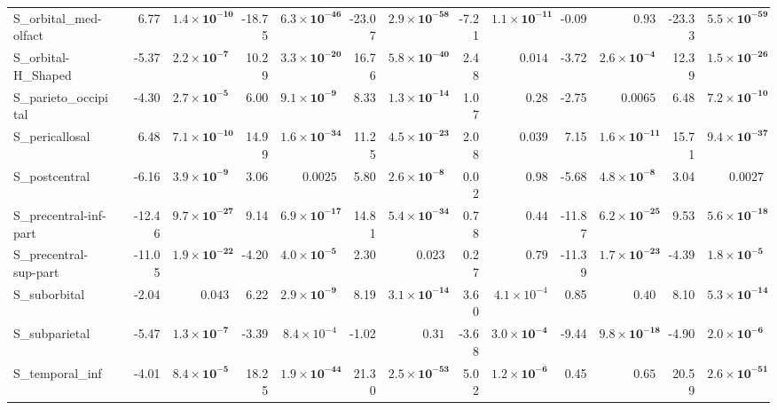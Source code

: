 {\begin{longtable}{llrrrrrrrrrrrr}
S\_orbital\_med-olfact &  & 6.77 & $\mathbf{1.4{\times}10^{-10}}$ & -18.75 & $\mathbf{6.3{\times}10^{-46}}$ & -23.07 & $\mathbf{2.9{\times}10^{-58}}$ & -7.21 & $\mathbf{1.1{\times}10^{-11}}$ & -0.09 & $0.93$ & -23.33 & $\mathbf{5.5{\times}10^{-59}}$ \\
S\_orbital-H\_Shaped &  & -5.37 & $\mathbf{2.2{\times}10^{-7}}$ & 10.29 & $\mathbf{3.3{\times}10^{-20}}$ & 16.76 & $\mathbf{5.8{\times}10^{-40}}$ & 2.48 & $0.014$ & -3.72 & $\mathbf{2.6{\times}10^{-4}}$ & 12.39 & $\mathbf{1.5{\times}10^{-26}}$ \\
S\_parieto\_occipital &  & -4.30 & $\mathbf{2.7{\times}10^{-5}}$ & 6.00 & $\mathbf{9.1{\times}10^{-9}}$ & 8.33 & $\mathbf{1.3{\times}10^{-14}}$ & 1.07 & $0.28$ & -2.75 & $0.0065$ & 6.48 & $\mathbf{7.2{\times}10^{-10}}$ \\
S\_pericallosal &  & 6.48 & $\mathbf{7.1{\times}10^{-10}}$ & 14.99 & $\mathbf{1.6{\times}10^{-34}}$ & 11.25 & $\mathbf{4.5{\times}10^{-23}}$ & 2.08 & $0.039$ & 7.15 & $\mathbf{1.6{\times}10^{-11}}$ & 15.71 & $\mathbf{9.4{\times}10^{-37}}$ \\
S\_postcentral &  & -6.16 & $\mathbf{3.9{\times}10^{-9}}$ & 3.06 & $0.0025$ & 5.80 & $\mathbf{2.6{\times}10^{-8}}$ & 0.02 & $0.98$ & -5.68 & $\mathbf{4.8{\times}10^{-8}}$ & 3.04 & $0.0027$ \\
S\_precentral-inf-part &  & -12.46 & $\mathbf{9.7{\times}10^{-27}}$ & 9.14 & $\mathbf{6.9{\times}10^{-17}}$ & 14.81 & $\mathbf{5.4{\times}10^{-34}}$ & 0.78 & $0.44$ & -11.87 & $\mathbf{6.2{\times}10^{-25}}$ & 9.53 & $\mathbf{5.6{\times}10^{-18}}$ \\
S\_precentral-sup-part &  & -11.05 & $\mathbf{1.9{\times}10^{-22}}$ & -4.20 & $\mathbf{4.0{\times}10^{-5}}$ & 2.30 & $0.023$ & 0.27 & $0.79$ & -11.39 & $\mathbf{1.7{\times}10^{-23}}$ & -4.39 & $\mathbf{1.8{\times}10^{-5}}$ \\
S\_suborbital &  & -2.04 & $0.043$ & 6.22 & $\mathbf{2.9{\times}10^{-9}}$ & 8.19 & $\mathbf{3.1{\times}10^{-14}}$ & 3.60 & $4.1{\times}10^{-4}$ & 0.85 & $0.40$ & 8.10 & $\mathbf{5.3{\times}10^{-14}}$ \\
S\_subparietal &  & -5.47 & $\mathbf{1.3{\times}10^{-7}}$ & -3.39 & $8.4{\times}10^{-4}$ & -1.02 & $0.31$ & -3.68 & $\mathbf{3.0{\times}10^{-4}}$ & -9.44 & $\mathbf{9.8{\times}10^{-18}}$ & -4.90 & $\mathbf{2.0{\times}10^{-6}}$ \\
S\_temporal\_inf &  & -4.01 & $\mathbf{8.4{\times}10^{-5}}$ & 18.25 & $\mathbf{1.9{\times}10^{-44}}$ & 21.30 & $\mathbf{2.5{\times}10^{-53}}$ & 5.02 & $\mathbf{1.2{\times}10^{-6}}$ & 0.45 & $0.65$ & 20.59 & $\mathbf{2.6{\times}10^{-51}}$ \\

\end{longtable}}
